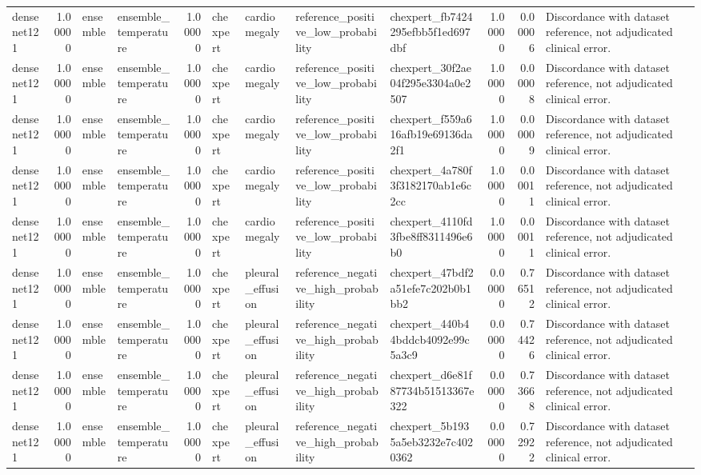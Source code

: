 \begin{tabular}{lrllrllllrrl}
densenet121 & 1.00000 & ensemble & ensemble\_temperature & 1.00000 & chexpert & cardiomegaly & reference\_positive\_low\_probability & chexpert\_fb7424295efbb5f1ed697dbf & 1.00000 & 0.00006 & Discordance with dataset reference, not adjudicated clinical error. \\
densenet121 & 1.00000 & ensemble & ensemble\_temperature & 1.00000 & chexpert & cardiomegaly & reference\_positive\_low\_probability & chexpert\_30f2ae04f295e3304a0e2507 & 1.00000 & 0.00008 & Discordance with dataset reference, not adjudicated clinical error. \\
densenet121 & 1.00000 & ensemble & ensemble\_temperature & 1.00000 & chexpert & cardiomegaly & reference\_positive\_low\_probability & chexpert\_f559a616afb19e69136da2f1 & 1.00000 & 0.00009 & Discordance with dataset reference, not adjudicated clinical error. \\
densenet121 & 1.00000 & ensemble & ensemble\_temperature & 1.00000 & chexpert & cardiomegaly & reference\_positive\_low\_probability & chexpert\_4a780f3f3182170ab1e6c2cc & 1.00000 & 0.00011 & Discordance with dataset reference, not adjudicated clinical error. \\
densenet121 & 1.00000 & ensemble & ensemble\_temperature & 1.00000 & chexpert & cardiomegaly & reference\_positive\_low\_probability & chexpert\_4110fd3fbe8ff8311496e6b0 & 1.00000 & 0.00011 & Discordance with dataset reference, not adjudicated clinical error. \\
densenet121 & 1.00000 & ensemble & ensemble\_temperature & 1.00000 & chexpert & pleural\_effusion & reference\_negative\_high\_probability & chexpert\_47bdf2a51efe7c202b0b1bb2 & 0.00000 & 0.76512 & Discordance with dataset reference, not adjudicated clinical error. \\
densenet121 & 1.00000 & ensemble & ensemble\_temperature & 1.00000 & chexpert & pleural\_effusion & reference\_negative\_high\_probability & chexpert\_440b44bddcb4092e99c5a3c9 & 0.00000 & 0.74426 & Discordance with dataset reference, not adjudicated clinical error. \\
densenet121 & 1.00000 & ensemble & ensemble\_temperature & 1.00000 & chexpert & pleural\_effusion & reference\_negative\_high\_probability & chexpert\_d6e81f87734b51513367e322 & 0.00000 & 0.73668 & Discordance with dataset reference, not adjudicated clinical error. \\
densenet121 & 1.00000 & ensemble & ensemble\_temperature & 1.00000 & chexpert & pleural\_effusion & reference\_negative\_high\_probability & chexpert\_5b1935a5eb3232e7c4020362 & 0.00000 & 0.72922 & Discordance with dataset reference, not adjudicated clinical error. \\

\end{tabular}
